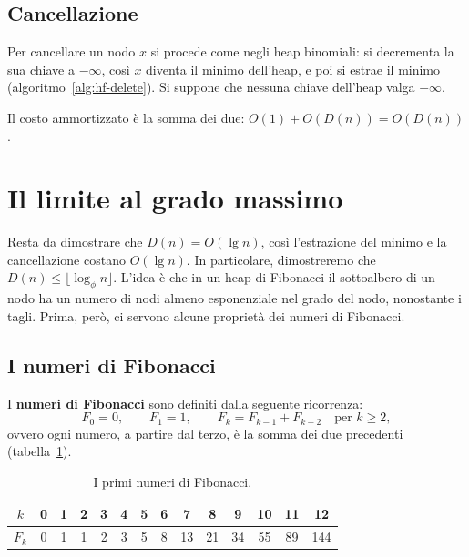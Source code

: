\subsection{Cancellazione}\label{sec:hf-delete}
Per cancellare un nodo $x$ si procede come negli heap binomiali: si decrementa la sua chiave a $-\infty$, così $x$ diventa il minimo dell'heap, e poi si estrae il minimo (algoritmo~\ref{alg:hf-delete}). Si suppone che nessuna chiave dell'heap valga $-\infty$.

\begin{algorithm}[htbp]
\caption{La cancellazione del nodo $x$: con la chiave $-\infty$, $x$ diventa il minimo dell'heap.}\label{alg:hf-delete}
\begin{algorithmic}[1]
  \State {} 
  \State {} 
\EndProcedure
\end{algorithmic}
\end{algorithm}

Il costo ammortizzato è la somma dei due: $O(1) + O(D(n)) = O(D(n))$.

\section{Il limite al grado massimo}\label{sec:hf-grado}
Resta da dimostrare che $D(n) = O(\lg n)$, così l'estrazione del minimo e la cancellazione costano $O(\lg n)$. In particolare, dimostreremo che $D(n) \le \lfloor \log_\phi n \rfloor$. L'idea è che in un heap di Fibonacci il sottoalbero di un nodo ha un numero di nodi almeno esponenziale nel grado del nodo, nonostante i tagli. Prima, però, ci servono alcune proprietà dei numeri di Fibonacci.

\subsection{I numeri di Fibonacci}\label{sec:hf-numeri}
I \textbf{numeri di Fibonacci} sono definiti dalla seguente ricorrenza:
\[
F_0 = 0, \qquad F_1 = 1, \qquad F_k = F_{k-1} + F_{k-2} \quad \text{per } k \ge 2,
\]
ovvero ogni numero, a partire dal terzo, è la somma dei due precedenti (tabella~\ref{tab:hf-fibonacci}).

\begin{table}[htbp]
\centering
\begin{tabular}{c|ccccccccccccc}
$k$ & 0 & 1 & 2 & 3 & 4 & 5 & 6 & 7 & 8 & 9 & 10 & 11 & 12 \\
\hline
$F_k$ & 0 & 1 & 1 & 2 & 3 & 5 & 8 & 13 & 21 & 34 & 55 & 89 & 144 \\
\end{tabular}
\caption{I primi numeri di Fibonacci.}
\label{tab:hf-fibonacci}
\end{table}

